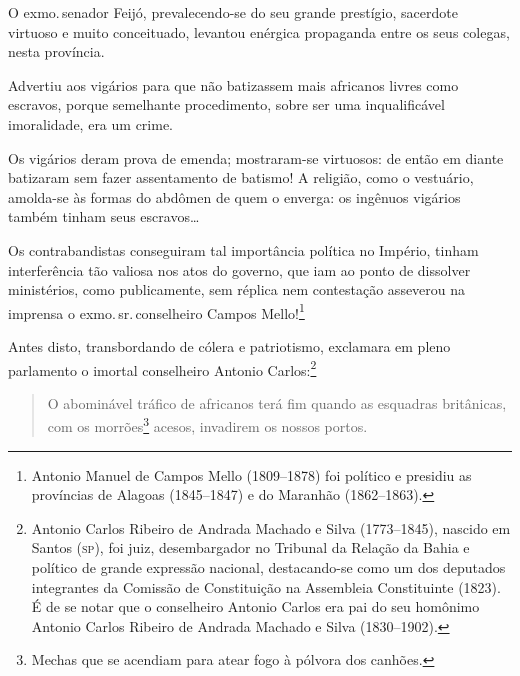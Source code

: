 O exmo.\,senador Feijó, prevalecendo-se do seu grande prestígio,
sacerdote virtuoso e muito conceituado, levantou enérgica propaganda
entre os seus colegas, nesta província.

Advertiu aos vigários para que não batizassem mais africanos livres como
escravos, porque semelhante procedimento, sobre ser uma inqualificável
imoralidade, era um crime.

Os vigários deram prova de emenda; mostraram-se virtuosos: de então em
diante batizaram sem fazer assentamento de batismo! A religião, como o
vestuário, amolda-se às formas do abdômen de quem o enverga: os ingênuos
vigários também tinham seus escravos\ldots{}

Os contrabandistas conseguiram tal importância política no Império,
tinham interferência tão valiosa nos atos do governo, que iam ao ponto
de dissolver ministérios, como publicamente, sem réplica nem contestação
asseverou na imprensa o exmo.\,sr.\,conselheiro Campos Mello!\footnote{ \label{mello}
  Antonio Manuel de Campos Mello (1809--1878) foi político e presidiu as
  províncias de Alagoas (1845--1847) e do Maranhão (1862--1863).}

Antes disto, transbordando de cólera e patriotismo, exclamara em pleno
parlamento o imortal conselheiro Antonio Carlos:\footnote{Antonio
  Carlos Ribeiro de Andrada Machado e Silva (1773--1845), nascido em
  Santos (\textsc{sp}), foi juiz, desembargador no Tribunal da Relação da Bahia e
  político de grande expressão nacional, destacando-se como um dos
  deputados integrantes da Comissão de Constituição na Assembleia
  Constituinte (1823). É de se notar que o conselheiro Antonio Carlos
  era pai do seu homônimo Antonio Carlos Ribeiro de Andrada Machado e
  Silva (1830--1902).}


\begin{quote}
O abominável tráfico de africanos terá fim quando as esquadras
britânicas, com os morrões\footnote{Mechas que se acendiam para atear
  fogo à pólvora dos canhões.} acesos, invadirem os nossos portos.
\end{quote}

